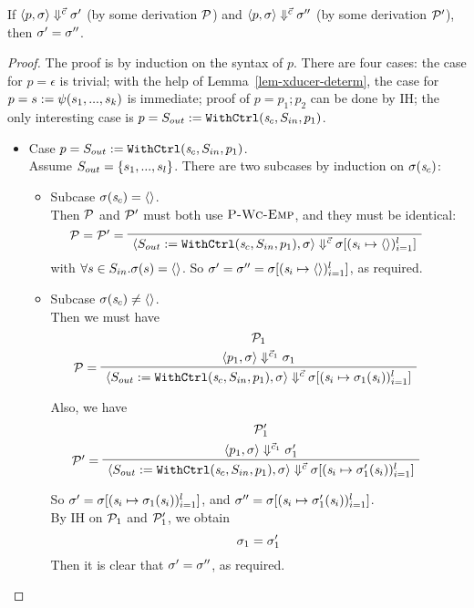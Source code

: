 \begin{thm} \label{thm-svcode-determ}
	If $\left\langle p,\sigma \right\rangle \Downarrow^{\vec c} \sigma'$ (by some derivation $\mathcal{P}$) and $\left\langle p,\sigma \right\rangle \Downarrow^{\vec c} \sigma''$ (by some derivation $\mathcal{P}'$), 
	then $\sigma' = \sigma''$.
\end{thm}

\begin{proof}
	The proof is by induction on the syntax of $p$. There are four cases: the case for $p = \epsilon$ is trivial; with the help of Lemma~\ref{lem-xducer-determ}, the case for $p = s := \psi(s_1,...,s_k)$ is immediate; proof of $p = p_1; p_2$ can be done by IH; the only interesting case is $p = S_{out} := \mathtt{WithCtrl}(\mathit{s}_c,S_{in},p_1)$.
	\begin{itemize}
		\item Case $p = S_{out} := \mathtt{WithCtrl}(\mathit{s}_c,S_{in},p_1)$. \\
		Assume $S_{out} = \{s_1,...,s_l\}$. There are two subcases by induction on $\sigma(\mathit{s}_c)$: 
		\begin{itemize}
			\item Subcase $\sigma(\mathit{s}_c) = \langle \rangle$. \\
			Then $\mathcal{P}$ and $\mathcal{P}'$ must both use $\textsc{P-Wc-Emp}$, and they must be identical:		
			$$\PT{ 
				\LeLa{\MP= \MP' =}
				\Axiom{\seval{\withctrl{\s_c}{p_1}{\Sin}{\Sout}}{\sgm}{\c}{\sgm[\l{\s_i \|-> \emptyv}]}}
			}$$
			with $ \forall s \in S_{in}. \sigma(s) = \langle \rangle$.
			So $\sgm' = \sgm'' = \sgm[\l{\s_i \|-> \emptyv}]$, as required. 
			
			\item Subcase $\sigma(\mathit{s}_c) \neq \langle \rangle$. \\
			Then we must have
			$$\PT{
				\UCN{\MP_1}{\seval{p_1}{\sgm}{\c_1}{\sgm_1}}
				\LeLa{\MP = }
				\UC{\seval{\withctrl{\s_c}{p_1}{\Sin}{\Sout}}{\sgm}{\c}{\sgm[\l{\s_i \|-> \sgm_1(\s_i)}]}}
			}$$
			
			Also, we have
			$$\PT{
				\UCN{\MP'_1}{\seval{p_1}{\sgm}{\c_1}{\sgm'_1}}
				\LeLa{\MP' = }
				\UC{\seval{\withctrl{\s_c}{p_1}{\Sin}{\Sout}}{\sgm}{\c}{\sgm[\l{\s_i \|-> \sgm'_1(\s_i)}]}}
			}$$
			
			So $\sgm' = \sgm[\l{\s_i \|-> \sgm_1(\s_i)}]$, 
			and $\sgm'' = \sgm[\l{\s_i \|-> \sgm'_1(\s_i)}]$. \\
			By IH on $\mathcal{P}_1$ and $\mathcal{P}'_1$, we obtain
			$$\sigma_1 = \sigma_1'$$
			Then it is clear that $\sigma' = \sigma''$, as required.
			
		\end{itemize} 
		
	\end{itemize}
	
\end{proof}




